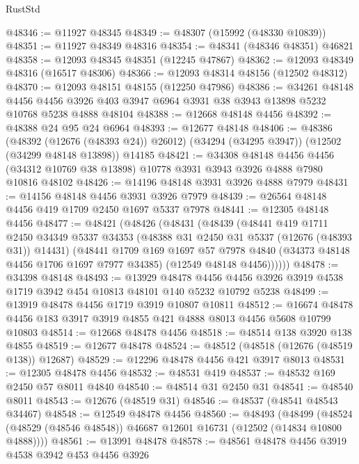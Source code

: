 \begin{lexlean}{RustStd}
\begin{coremodule}
@48346 := @11927 @48345
@48349 := @48307 (@15992 (@48330 @10839))
@48351 := @11927 @48349 @48316
@48354 := @48341 (@48346 @48351) @46821
@48358 := @12093 @48345 @48351 (@12245 @47867)
@48362 := @12093 @48349 @48316 (@16517 @48306)
@48366 := @12093 @48314 @48156 (@12502 @48312)
@48370 := @12093 @48151 @48155 (@12250 @47986)
@48386 := @34261
    @48148
    @4456
    @4456
    @3926
    @403
    @3947
    @6964
    @3931
    @38
    @3943
    @13898
    @5232
    @10768
    @5238
    @4888
    @48104
@48388 := @12668 @48148 @4456
@48392 := @48388 @24 @95 @24 @6964
@48393 := @12677 @48148
@48406 := @48386
    (@48392 (@12676 (@48393 @24)) @26012)
    (@34294 (@34295 @3947))
    (@12502 (@34299 @48148 @13898))
    @14185
@48421 := @34308
    @48148
    @4456
    @4456
    (@34312 @10769 @38 @13898)
    @10778
    @3931
    @3943
    @3926
    @4888
    @7980
    @10816
    @48102
@48426 := @14196 @48148 @3931 @3926 @4888 @7979
@48431 := @14156 @48148 @4456 @3931 @3926 @7979
@48439 := @26564 @48148 @4456 @419 @1709 @2450 @1697 @5337 @7978
@48441 := @12305 @48148 @4456
@48477 := @48421
    (@48426
      (@48431
        (@48439
          (@48441
            @419
            @1711
            @2450
            @34349
            @5337
            @34353
            (@48388 @31 @2450 @31 @5337 (@12676 (@48393 @31)) @14431)
            (@48441
              @1709
              @169
              @1697
              @57
              @7978
              @4840
              (@34373 @48148 @4456 @1706 @1697 @7977 @34385)
              (@12549 @48148 @4456))))))
@48478 := @34398 @48148
@48493 := @13929
    @48478
    @4456
    @4456
    @3926
    @3919
    @4538
    @1719
    @3942
    @454
    @10813
    @48101
    @140
    @5232
    @10792
    @5238
@48499 := @13919 @48478 @4456 @1719 @3919 @10807 @10811
@48512 := @16674 @48478 @4456 @183 @3917 @3919 @4855 @421 @4888 @8013 @4456 @5608 @10799 @10803
@48514 := @12668 @48478 @4456
@48518 := @48514 @138 @3920 @138 @4855
@48519 := @12677 @48478
@48524 := @48512 (@48518 (@12676 (@48519 @138)) @12687)
@48529 := @12296 @48478 @4456 @421 @3917 @8013
@48531 := @12305 @48478 @4456
@48532 := @48531 @419
@48537 := @48532 @169 @2450 @57 @8011 @4840
@48540 := @48514 @31 @2450 @31
@48541 := @48540 @8011
@48543 := @12676 (@48519 @31)
@48546 := @48537 (@48541 @48543 @34467)
@48548 := @12549 @48478 @4456
@48560 := @48493
    (@48499 (@48524 (@48529 (@48546 @48548)) @46687 @12601 @16731 (@12502 (@14834 @10800 @4888))))
@48561 := @13991 @48478
@48578 := @48561
    @48478
    @4456
    @3919
    @4538
    @3942
    @453
    @4456
    @3926

\end{coremodule}
\end{lexlean}
